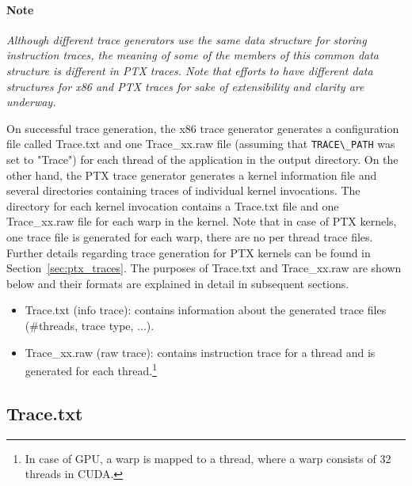 \paragraph{Note}

\textit{Although different trace generators use the same data structure for
storing instruction traces, the meaning of some of the members of this
common data structure is different in PTX traces. Note that efforts to
have different data structures for x86 and PTX traces for sake of
extensibility and clarity are underway.}


On successful trace generation, the x86 trace generator generates a
configuration file called Trace.txt and one Trace\_xx.raw file
(assuming that \Verb+TRACE\_PATH+ was set to "Trace") for each thread
of the application in the output directory. On the other hand, the PTX
trace generator generates a kernel information file and several
directories containing traces of individual kernel invocations. The
directory for each kernel invocation contains a Trace.txt file and one
Trace\_xx.raw file for each warp in the kernel.  Note that in case of
PTX kernels, one trace file is generated for each warp, there are no
per thread trace files. Further details regarding trace generation for
PTX kernels can be found in Section~\ref{sec:ptx_traces}. The purposes
of Trace.txt and Trace\_xx.raw are shown below and their formats are
explained in detail in subsequent sections.


\begin{itemize}\itemsep2pt
\item Trace.txt (info trace): contains information about the generated
  trace files (\#threads, trace type, ...).

\item Trace\_xx.raw (raw trace): contains instruction trace for a
  thread and is generated for each thread.\footnote{In case of GPU, a
    warp is mapped to a \SIM thread, where a warp consists of 32
    threads in CUDA.}
\end{itemize}



\subsection{Trace.txt}



